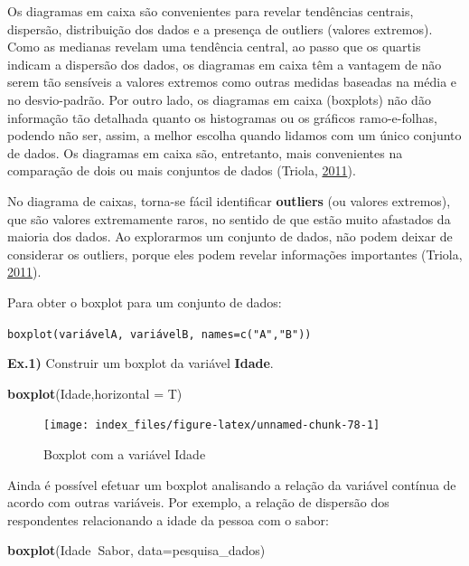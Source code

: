 \documentclass[12pt,brazil,oneside]{book}
\newenvironment{Shaded}{\begin{snugshade}}{\end{snugshade}}
\newcommand{\DataTypeTok}[1]{\textcolor[rgb]{0.13,0.29,0.53}{#1}}
\newcommand{\KeywordTok}[1]{\textcolor[rgb]{0.13,0.29,0.53}{\textbf{#1}}}
\newcommand{\NormalTok}[1]{#1}
\newcommand{\OperatorTok}[1]{\textcolor[rgb]{0.81,0.36,0.00}{\textbf{#1}}}
\begin{document}
Os diagramas em caixa são convenientes para revelar tendências centrais, dispersão, distribuição dos dados e a presença de outliers (valores extremos). Como as medianas revelam uma tendência central, ao passo que os quartis indicam a dispersão dos dados, os diagramas em caixa têm a vantagem de não serem tão sensíveis a valores extremos como outras medidas baseadas na média e no desvio-padrão. Por outro lado, os diagramas em caixa (boxplots) não dão informação tão detalhada quanto os histogramas ou os gráficos ramo-e-folhas, podendo não ser, assim, a melhor escolha quando lidamos com um único conjunto de dados. Os diagramas em caixa são, entretanto, mais convenientes na comparação de dois ou mais conjuntos de dados (Triola, \protect\hyperlink{ref-triola1999}{2011}).

No diagrama de caixas, torna-se fácil identificar \textbf{outliers} (ou valores extremos), que são valores extremamente raros, no sentido de que estão muito afastados da maioria dos dados. Ao explorarmos um conjunto de dados, não podem deixar de considerar os outliers, porque eles podem revelar informações importantes (Triola, \protect\hyperlink{ref-triola1999}{2011}).

Para obter o boxplot para um conjunto de dados:

\texttt{boxplot(variávelA,\ variávelB,\ names=c("A","B"))}

\textbf{Ex.1)} Construir um boxplot da variável \textbf{Idade}.

\begin{Shaded}
\begin{Highlighting}[]
\KeywordTok{boxplot}\NormalTok{(Idade,}\DataTypeTok{horizontal =}\NormalTok{ T)}
\end{Highlighting}
\end{Shaded}

\begin{figure}[H]

{\centering \texttt{[image: index\_files/figure-latex/unnamed-chunk-78-1]} 

}

\caption{Boxplot com a variável Idade}\label{fig:unnamed-chunk-78}
\end{figure}

Ainda é possível efetuar um boxplot analisando a relação da variável contínua de acordo com outras variáveis. Por exemplo, a relação de dispersão dos respondentes relacionando a idade da pessoa com o sabor:

\begin{Shaded}
\begin{Highlighting}[]
\KeywordTok{boxplot}\NormalTok{(Idade}\OperatorTok{~}\NormalTok{Sabor, }\DataTypeTok{data=}\NormalTok{pesquisa_dados)}
\end{Highlighting}
\end{Shaded}
\end{document}
